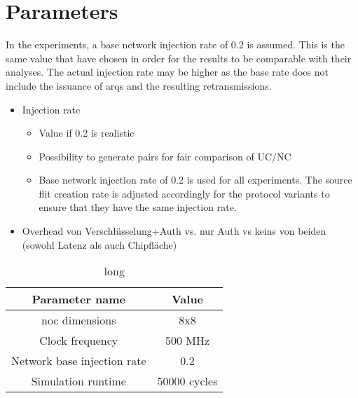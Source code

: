 \section{Parameters}
In the experiments, a base network injection rate of 0.2 is assumed. This is the same value that \citeauthor{moriam18activeattackers} have chosen
\cite[2]{moriam18activeattackers} in order for the results to be comparable with their analyses. The actual injection rate may be higher as the base rate does not include the
issuance of \glspl{arq} and the resulting retransmissions.
\begin{itemize}
    \item Injection rate
        \begin{itemize}
            \item Value if 0.2 is realistic
            \item Possibility to generate pairs for fair comparison of UC/NC
            \item Base network injection rate of 0.2 is used for all experiments. The source flit creation rate is adjusted accordingly for the
                protocol variants to ensure that they have the same injection rate.
        \end{itemize}
    \item Overhead von Verschlüsselung+Auth vs. nur Auth vs keins von beiden (sowohl Latenz als auch Chipfläche)
\end{itemize}

\begin{table}
    \centering
    \begin{tabulary}{\textwidth}{C|C}
        Parameter name & Value \\\hline
        \Gls{noc} dimensions & 8x8 \\
        Clock frequency & 500 MHz \\
        Network base injection rate & 0.2 \\
        Simulation runtime & \num{50000} cycles \\
    \end{tabulary}
    \caption[short]{long}
    \label{tab:fixedparams}
\end{table}

